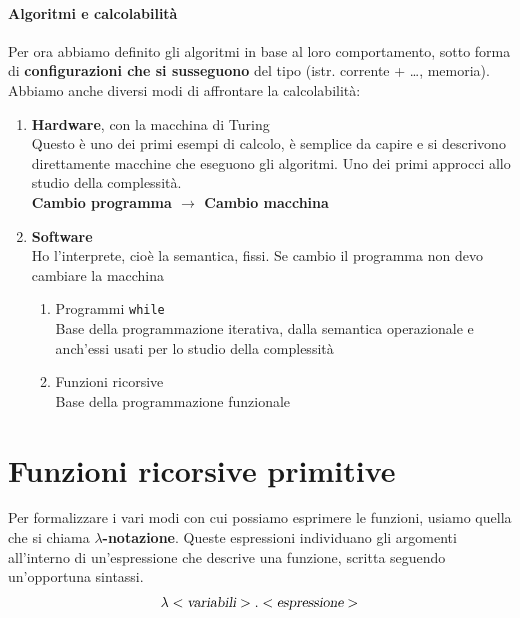 \documentclass[10pt]{book}
\begin{document}
\paragraph{Algoritmi e calcolabilità} Per ora abbiamo definito gli algoritmi in base al loro comportamento, sotto forma di \textbf{configurazioni che si susseguono} del tipo (istr. corrente + \ldots, memoria). Abbiamo anche diversi modi di affrontare la calcolabilità:
\begin{enumerate}
	\item \textbf{Hardware}, con la macchina di Turing\\
	Questo è uno dei primi esempi di calcolo, è semplice da capire e si descrivono direttamente macchine che eseguono gli algoritmi. Uno dei primi approcci allo studio della complessità.\\
	\textbf{Cambio programma $\rightarrow$ Cambio macchina}
	\item \textbf{Software}\\
	Ho l'interprete, cioè la semantica, fissi. Se cambio il programma non devo cambiare la macchina
	\begin{enumerate}
		\item Programmi \texttt{while}\\
		Base della programmazione iterativa, dalla semantica operazionale e anch'essi usati per lo studio della complessità
		\item Funzioni ricorsive\\
		Base della programmazione funzionale
	\end{enumerate}
\end{enumerate}

\section{Funzioni ricorsive primitive}
Per formalizzare i vari modi con cui possiamo esprimere le funzioni, usiamo quella che si chiama \textbf{$\lambda$-notazione}. Queste espressioni individuano gli argomenti all'interno di un'espressione che descrive una funzione, scritta seguendo un'opportuna sintassi.
$$\lambda <\textsl{variabili}>.<\textsl{espressione}>$$
\end{document}
